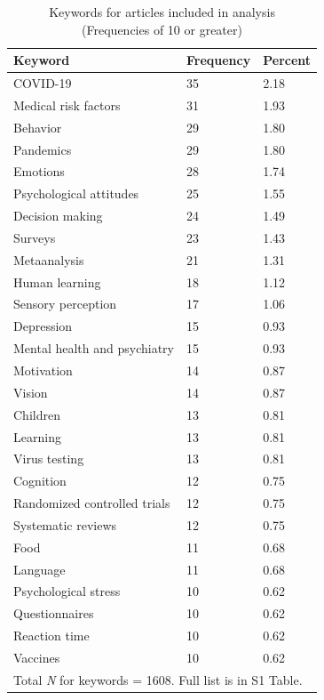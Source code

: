 \documentclass[authordate, meta]{jote-new-article}
\begin{document}
	\begin{table}
		\centering
		\begin{fullwidth}
			\caption{Keywords for articles included in analysis\\ (Frequencies of 10 or greater)}
			\begin{tabularx}{\linewidth}{@{} l X X @{}}
				\toprule
				\textbf{Keyword} & \textbf{Frequency} & \textbf{Percent} \\
				\midrule
				COVID-19 & 35 & 2.18 \\
				Medical risk factors & 31 & 1.93 \\
				Behavior & 29 & 1.80 \\
				Pandemics & 29 & 1.80 \\
				Emotions & 28 & 1.74 \\
				Psychological attitudes & 25 & 1.55 \\
				Decision making & 24 & 1.49 \\
				Surveys & 23 & 1.43 \\
				Metaanalysis & 21 & 1.31 \\
				Human learning & 18 & 1.12 \\
				Sensory perception & 17 & 1.06 \\
				Depression & 15 & 0.93 \\
				Mental health and psychiatry & 15 & 0.93 \\
				Motivation & 14 & 0.87 \\
				Vision & 14 & 0.87 \\
				Children & 13 & 0.81 \\
				Learning & 13 & 0.81 \\
				Virus testing & 13 & 0.81 \\
				Cognition & 12 & 0.75 \\
				Randomized controlled trials & 12 & 0.75 \\
				Systematic reviews & 12 & 0.75 \\
				Food & 11 & 0.68 \\
				Language & 11 & 0.68 \\
				Psychological stress & 10 & 0.62 \\
				Questionnaires & 10 & 0.62 \\
				Reaction time & 10 & 0.62 \\
				Vaccines & 10 & 0.62 \\
				\bottomrule
				\multicolumn{3}{l}{Total \emph{N} for keywords = 1608.  Full list is in S1 Table.} \\
				
			\end{tabularx}
		\end{fullwidth}
	\end{table}
	
\end{document}

